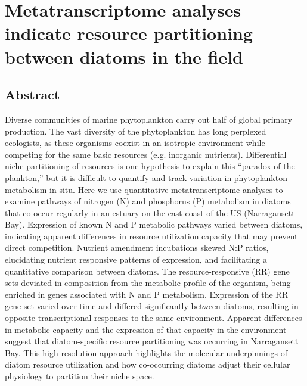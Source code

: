\chapter{Metatranscriptome analyses indicate resource partitioning between diatoms in the field}

\section{Abstract}
Diverse communities of marine phytoplankton carry out half of global primary production. The vast diversity of the phytoplankton has long perplexed ecologists, as these organisms coexist in an isotropic environment while competing for the same basic resources (e.g. inorganic nutrients). Differential niche partitioning of resources is one hypothesis to explain this “paradox of the plankton,” but it is difficult to quantify and track variation in phytoplankton metabolism in situ. Here we use quantitative metatranscriptome analyses to examine pathways of nitrogen (N) and phosphorus (P) metabolism in diatoms that co-occur regularly in an estuary on the east coast of the US (Narragansett Bay). Expression of known N and P metabolic pathways varied between diatoms, indicating apparent differences in resource utilization capacity that may prevent direct competition.  Nutrient amendment incubations skewed N:P ratios, elucidating nutrient responsive patterns of expression, and facilitating a quantitative comparison between diatoms. The resource-responsive (RR) gene sets deviated in composition from the metabolic profile of the organism, being enriched in genes associated with N and P metabolism. Expression of the RR gene set varied over time and differed significantly between diatoms, resulting in opposite transcriptional responses to the same environment. Apparent differences in metabolic capacity and the expression of that capacity in the environment suggest that diatom-specific resource partitioning was occurring in Narragansett Bay. This high-resolution approach highlights the molecular underpinnings of diatom resource utilization and how co-occurring diatoms adjust their cellular physiology to partition their niche space. 
 
